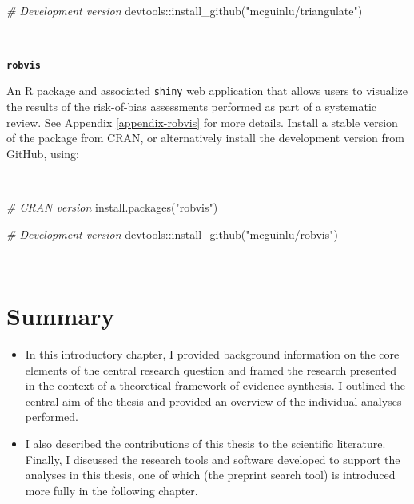 \documentclass[a4paper, twoside]{templates/ociamthesis}
\newenvironment{Shaded}{\begin{snugshade}}{\end{snugshade}}
\newcommand{\CommentTok}[1]{\textcolor[rgb]{0.56,0.35,0.01}{\textit{#1}}}
\newcommand{\FunctionTok}[1]{\textcolor[rgb]{0.00,0.00,0.00}{#1}}
\newcommand{\NormalTok}[1]{#1}
\newcommand{\SpecialCharTok}[1]{\textcolor[rgb]{0.00,0.00,0.00}{#1}}
\newcommand{\StringTok}[1]{\textcolor[rgb]{0.31,0.60,0.02}{#1}}
\renewenvironment{Shaded}
{
  \vspace{4pt}%
  \begin{snugshade}%
}{%
  \end{snugshade}%
  \vspace{4pt}%
}
\begin{document}
~

\begin{Shaded}
\begin{Highlighting}[]
\CommentTok{\# Development version}
\NormalTok{devtools}\SpecialCharTok{::}\FunctionTok{install\_github}\NormalTok{(}\StringTok{"mcguinlu/triangulate"}\NormalTok{)}
\end{Highlighting}
\end{Shaded}

~

\textbf{\texttt{robvis}}

An R package and associated \texttt{shiny} web application that allows users to visualize the results of the risk-of-bias assessments performed as part of a systematic review. See Appendix \ref{appendix-robvis} for more details. Install a stable version of the package from CRAN, or alternatively install the development version from GitHub, using:

~

\begin{Shaded}
\begin{Highlighting}[]
\CommentTok{\# CRAN version}
\FunctionTok{install.packages}\NormalTok{(}\StringTok{"robvis"}\NormalTok{)}

\CommentTok{\# Development version}
\NormalTok{devtools}\SpecialCharTok{::}\FunctionTok{install\_github}\NormalTok{(}\StringTok{"mcguinlu/robvis"}\NormalTok{)}
\end{Highlighting}
\end{Shaded}

~

\hypertarget{summary}{%
\section{Summary}\label{summary}}

\begin{itemize}
\item
  In this introductory chapter, I provided background information on the core elements of the central research question and framed the research presented in the context of a theoretical framework of evidence synthesis. I outlined the central aim of the thesis and provided an overview of the individual analyses performed.
\item
  I also described the contributions of this thesis to the scientific literature. Finally, I discussed the research tools and software developed to support the analyses in this thesis, one of which (the preprint search tool) is introduced more fully in the following chapter.
\end{itemize}
\end{document}
